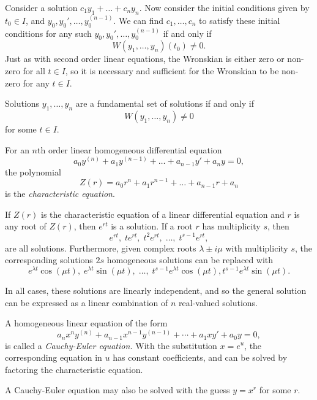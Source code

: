 \begin{thm}
    Consider a solution $c_1y_1 + \ldots + c_ny_n$. Now consider the initial conditions given by $t_0 \in I$, and $y_0, y_0', \ldots, y_0^{(n-1)}$. We can find $c_1, \ldots, c_n$ to satisfy these initial conditions for any such $y_0, y_0', \ldots, y_0^{(n-1)}$ if and only if
    \[W(y_1, \ldots, y_n)(t_0) \neq 0.\] Just as with second order linear equations, the Wronskian is either zero or non-zero for all $t \in I$, so it is necessary and sufficient for the Wronskian to be non-zero for any $t \in I$.
\end{thm}

\begin{prop}
    Solutions $y_1, \ldots, y_n$ are a fundamental set of solutions if and only if
    \[W(y_1, \ldots, y_n) \neq 0\] for some $t \in I$.
\end{prop}

\begin{defn}
    For an $n$th order linear homogeneous differential equation
    \[a_0y^{(n)} + a_1y^{(n-1)} + \ldots + a_{n-1}y' + a_ny = 0,\]
    the polynomial
    \[Z(r) = a_0r^n + a_1r^{n-1} + \ldots + a_{n-1}r + a_n\] is the \emph{characteristic equation}.
\end{defn}

\begin{prop}
    If $Z(r)$ is the characteristic equation of a linear differential equation and $r$ is any root of $Z(r)$, then $e^{rt}$ is a solution. If a root $r$ has multiplicity $s$, then
    \[e^{rt},\; te^{rt},\; t^2e^{rt},\; \ldots,\; t^{s-1}e^{rt},\]
    are all solutions. Furthermore, given complex roots $\lambda \pm i\mu$ with multiplicity $s$, the corresponding solutions $2s$ homogeneous solutions can be replaced with
    \[e^{\lambda t}\cos(\mu t),\; e^{\lambda t}\sin(\mu t),\; \ldots,\; t^{s-1}e^{\lambda t}\cos(\mu t), t^{s-1}e^{\lambda t}\sin(\mu t).\]

    In all cases, these solutions are linearly independent, and so the general solution can be expressed as a linear combination of $n$ real-valued solutions.
\end{prop}

\begin{defn}
    A homogeneous linear equation of the form
    \[a_nx^ny^{(n)} + a_{n-1}x^{n-1}y^{(n-1)} + \cdots + a_1xy' + a_0y = 0,\] is called a \emph{Cauchy-Euler equation.} With the substitution $x = e^u$, the corresponding equation in $u$ has constant coefficients, and can be solved by factoring the characteristic equation.

    A Cauchy-Euler equation may also be solved with the guess $y = x^r$ for some $r$.
\end{defn}

